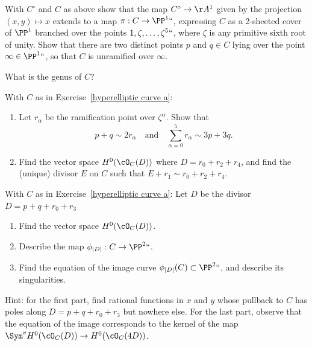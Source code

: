 \begin{exercise}\label{hyperelliptic curve a}
With $C^\circ$ and $C$  as above show  that the map $C^\circ \to
\AA^1$ given by the projection $(x,y) \mapsto x$ extends to a map $\pi
: C \to \PP^1` `$, expressing $C$ as a 2-sheeted cover of $\PP^1$
branched over the points $1, \zeta, \dots, \zeta^5` `$, where $\zeta$
is any primitive sixth root of unity. Show that there are two distinct
points $p$ and $q \in C$  lying over the point $\infty \in \PP^1` `$,
so that $C$ is unramified over $\infty$.

What is the genus of $C$?
\end{exercise}

\begin{exercise} With $C$ as in Exercise~\ref{hyperelliptic curve a}:
\begin{enumerate}

\item Let $r_\alpha$ be the ramification point over $\zeta^\alpha$. Show that
$$
p+q \sim 2r_\alpha \quad \text{and} \quad \sum_{\alpha = 0}^5 r_\alpha \sim 3p+3q.
$$

\item Find the vector space $H^0(\cO_C(D))$ where $D = r_0 + r_2 + r_4$, and find the (unique) divisor $E$ on $C$ such that $E + r_1 \sim r_0 + r_2 + r_4$.

\end{enumerate}

\end{exercise}

\begin{exercise}
With $C$ as in Exercise~\ref{hyperelliptic curve a}:
Let $D$ be the divisor $D = p + q + r_0 + r_3$
\begin{enumerate}
\item Find the vector space $H^0(\cO_C(D))$.
\item Describe the map $\phi_{|D|} : C \to \PP^2` `$.
\item Find the equation of the image curve $\phi_{|D|}(C) \subset \PP^2` `$, and describe its singularities.
\end{enumerate}
Hint: for the first part, find rational functions in $x$ and $y$ whose pullback to $C$ has poles along $D = p + q + r_0 + r_3$ but nowhere else. For the last part, observe that the equation of the image corresponds to the kernel of the map $\Sym^v H^0(\cO_C(D)) \to H^0(\cO_C(4D))$.
\end{exercise}
 

